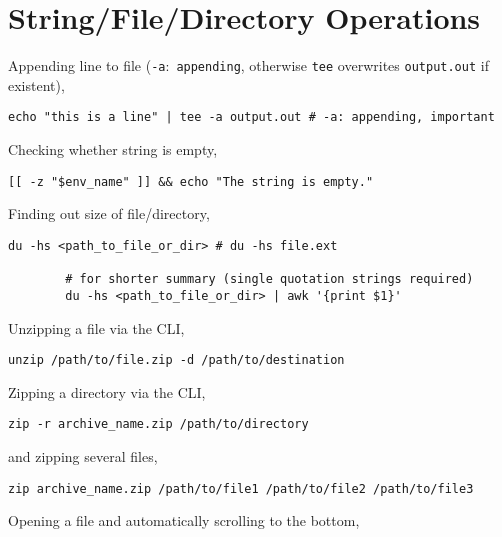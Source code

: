 \documentclass[12pt, a4paper]{scrbook}
\numberwithin{equation}{section}
\theoremstyle{definition}
\theoremstyle{definition}
\begin{document}
	\section{String/File/Directory Operations}
	
	Appending line to file (\texttt{-a}:~\texttt{appending}, otherwise \texttt{tee} overwrites \texttt{output.out} if existent),
	
	\begin{lstlisting}[style=mystylebash, label=alg:ubuntu__line_appending, xleftmargin=\parindent]
		echo "this is a line" | tee -a output.out # -a: appending, important
	\end{lstlisting}
	
	Checking whether string is empty,
	
	\begin{lstlisting}[style=mystylebash, label=alg:bash__empty_string_check, xleftmargin=\parindent]
		[[ -z "$env_name" ]] && echo "The string is empty."
	\end{lstlisting}
	
	Finding out size of file/directory,
	
	\begin{lstlisting}[style=mystylebash, label=alg:dir_size, xleftmargin=\parindent]
		du -hs <path_to_file_or_dir> # du -hs file.ext
		
		# for shorter summary (single quotation strings required)
		du -hs <path_to_file_or_dir> | awk '{print $1}'
	\end{lstlisting}

	Unzipping a file via the CLI, 
	\begin{lstlisting}[style=mystylebash, label=alg:bash_unzip, xleftmargin=\parindent]
		unzip /path/to/file.zip -d /path/to/destination
	\end{lstlisting}

	Zipping a directory via the CLI,
	\begin{lstlisting}[style=mystylebash, label=alg:bash_zip, xleftmargin=\parindent]
		zip -r archive_name.zip /path/to/directory
	\end{lstlisting}

	and zipping several files,
	
	\begin{lstlisting}[style=mystylebash, label=alg:bash_zip__files, xleftmargin=\parindent]
		zip archive_name.zip /path/to/file1 /path/to/file2 /path/to/file3
 	\end{lstlisting}

	Opening a file and automatically scrolling to the bottom,
	
\end{document}
